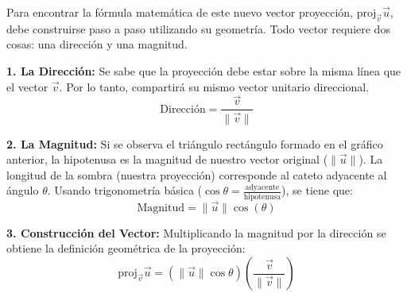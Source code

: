 \begin{center}
\shorthandoff{>}
\end{center}

Para encontrar la fórmula matemática de este nuevo vector proyección, $\text{proj}_{\vec{v}}\vec{u}$, debe construirse paso a paso utilizando su geometría. Todo vector requiere dos cosas: una dirección y una magnitud.

\textbf{1. La Dirección:} 
Se sabe que la proyección debe estar sobre la misma línea que el vector $\vec{v}$. Por lo tanto, compartirá su mismo vector unitario direccional.
\[ \text{Dirección} = \frac{\vec{v}}{\|\vec{v}\|} \]

\textbf{2. La Magnitud:} 
Si se observa el triángulo rectángulo formado en el gráfico anterior, la hipotenusa es la magnitud de nuestro vector original ($\|\vec{u}\|$). La longitud de la sombra (nuestra proyección) corresponde al cateto adyacente al ángulo $\theta$. Usando trigonometría básica ($\cos\theta = \frac{\text{adyacente}}{\text{hipotenusa}}$), se tiene que:
\[ \text{Magnitud} = \|\vec{u}\| \cos(\theta) \]

\textbf{3. Construcción del Vector:}
Multiplicando la magnitud por la dirección se obtiene la definición geométrica de la proyección:
\[ \text{proj}_{\vec{v}}\vec{u} = (\|\vec{u}\| \cos\theta) \left(\frac{\vec{v}}{\|\vec{v}\|}\right) \]

